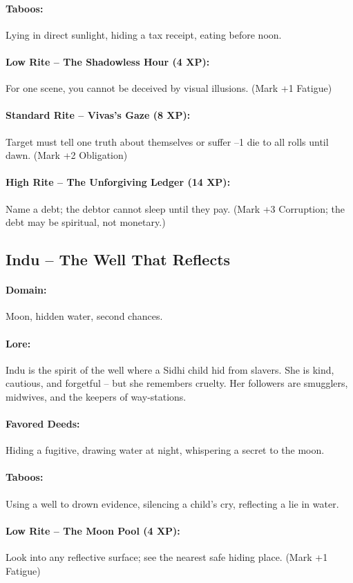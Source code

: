 \documentclass[11pt]{book}
\begin{document}
\paragraph{Taboos:} Lying in direct sunlight, hiding a tax receipt, eating before noon.
\paragraph{Low Rite -- The Shadowless Hour (4 XP):} For one scene, you cannot be deceived by visual illusions. (Mark +1 Fatigue)
\paragraph{Standard Rite -- Vivas's Gaze (8 XP):} Target must tell one truth about themselves or suffer --1 die to all rolls until dawn. (Mark +2 Obligation)
\paragraph{High Rite -- The Unforgiving Ledger (14 XP):} Name a debt; the debtor cannot sleep until they pay. (Mark +3 Corruption; the debt may be spiritual, not monetary.)

\subsection{Indu -- The Well That Reflects}
\paragraph{Domain:} Moon, hidden water, second chances.
\paragraph{Lore:} Indu is the spirit of the well where a Sidhi child hid from slavers. She is kind, cautious, and forgetful -- but she remembers cruelty. Her followers are smugglers, midwives, and the keepers of way‑stations.
\paragraph{Favored Deeds:} Hiding a fugitive, drawing water at night, whispering a secret to the moon.
\paragraph{Taboos:} Using a well to drown evidence, silencing a child's cry, reflecting a lie in water.
\paragraph{Low Rite -- The Moon Pool (4 XP):} Look into any reflective surface; see the nearest safe hiding place. (Mark +1 Fatigue)
\end{document}
